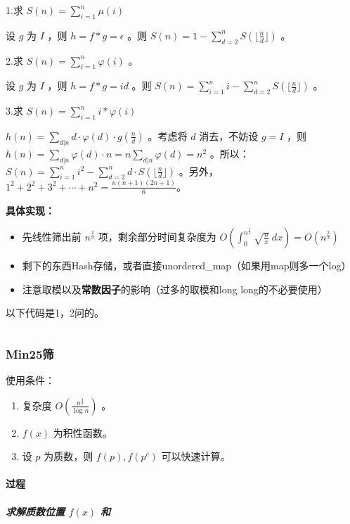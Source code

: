\documentclass[a4paper,11pt]{article}
\begin{document}
1.求 \(S(n)=\sum\limits_{i=1}^{n}{\mu(i)}\)

设 \(g\) 为 \(I\) ，则 \(h=f*g=\epsilon\) 。则
\(S(n)=1-\sum\limits_{d=2}^{n}{S(\lfloor \frac{n}{d}\rfloor)}\) 。

2.求 \(S(n)=\sum\limits_{i=1}^{n}{\varphi(i)}\) 。

设 \(g\) 为 \(I\) ，则 \(h=f*g=id\) 。则
\(S(n)=\sum\limits_{i=1}^{n}{i}-\sum\limits_{d=2}^{n}{S(\lfloor \frac{n}{d}\rfloor)}\)
。

3.求 \(S(n)=\sum\limits_{i=1}^{n}{i*\varphi(i)}\)

\(h(n)=\sum_{d|n}{d\cdot\varphi(d)}\cdot g(\frac{n}{d})\) 。考虑将 \(d\)
消去，不妨设 \(g=I\) ，则
\(h(n)=\sum_{d|n}{\varphi(d)}\cdot {n}=n\sum_{d|n}{\varphi(d)}=n^2\)
。所以：\(S(n)=\sum_{i=1}^{n}i^2-\sum_{d=2}^{n}d\cdot S(\lfloor\frac{n}{d}\rfloor)\)
。另外，\(1^2+2^2+3^2+\cdots+n^2=\frac{n(n+1)(2n+1)}{6}。\)

\textbf{具体实现：}

\begin{itemize}
\item
  先线性筛出前 \(n^{\frac{2}{3}}\) 项，剩余部分时间复杂度为
  \(O(\int_0^{n^{\frac{1}{3}}}{\sqrt{\frac{n}{x}}}\ dx)=O(n^{\frac{2}{3}})\)
\item
  剩下的东西Hash存储，或者直接unordered\_map（如果用map则多一个log）
\item
  注意取模以及\textbf{常数因子}的影响（过多的取模和long
  long的不必要使用）
\end{itemize}

以下代码是1，2问的。
\inputminted[linenos]{c++}{math/dujiaoshai.cpp}

\subsubsection{Min25筛}
使用条件：

\begin{enumerate}
  \item 复杂度 \(O(\frac{n^{\frac{3}{4}}}{\log n})\) 。
  \item \(f(x)\) 为积性函数。
  \item 设 \(p\) 为质数，则 \(f(p),f(p^c)\) 可以快速计算。
\end{enumerate}

\paragraph{过程}

\subparagraph{求解质数位置 \(f(x)\) 和} 
\leavevmode
\end{document}
